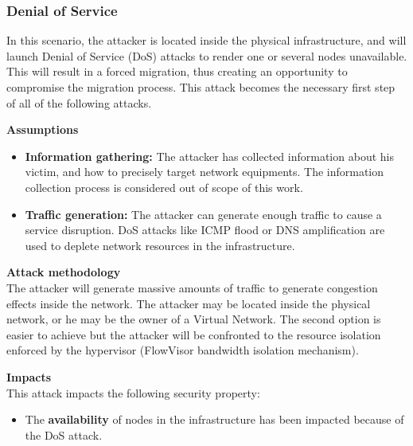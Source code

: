 \subsubsection{Denial of Service}
In this scenario, the attacker is located inside the physical infrastructure, and will launch Denial of Service (DoS) attacks to render one or several nodes unavailable.
This will result in a forced migration, thus creating an opportunity to compromise the migration process.
This attack becomes the necessary first step of all of the following attacks.

\textbf{Assumptions}
\begin{itemize}
    \item \textbf{Information gathering:} The attacker has collected information about his victim, and how to precisely target network equipments.
The information collection process is considered out of scope of this work.
    \item \textbf{Traffic generation:} The attacker can generate enough traffic to cause a service disruption.
DoS attacks like ICMP flood or DNS amplification are used to deplete network resources in the infrastructure.
\end{itemize}

\textbf{Attack methodology}\textbf{\\}
The attacker will generate massive amounts of traffic to generate congestion effects inside the network. The attacker may be located inside the physical network, or he may be the owner of a Virtual Network. The second option is easier to achieve but the attacker will be confronted to the resource isolation enforced by the hypervisor (\ie FlowVisor bandwidth isolation mechanism).


\textbf{Impacts}\textbf{\\}
This attack impacts the following security property:
\begin{itemize}
    \item The \textbf{availability} of nodes in the infrastructure has been impacted because of the DoS attack.
\end{itemize}



